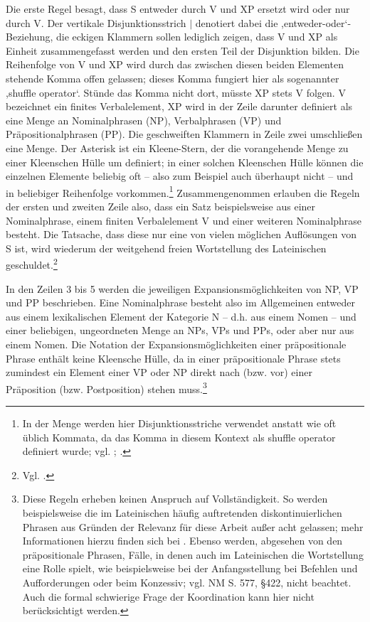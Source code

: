 \documentclass[12pt,a4paper]{article}
\begin{document}
Die erste Regel besagt, dass S entweder durch V und XP ersetzt wird oder nur durch V. Der vertikale Disjunktionsstrich $\mid$ denotiert dabei die ,entweder-oder‘-Beziehung, die eckigen Klammern sollen lediglich zeigen, dass V und XP als Einheit zusammengefasst werden und den ersten Teil der Disjunktion bilden. Die Reihenfolge von V und XP wird durch das zwischen diesen beiden Elementen stehende Komma offen gelassen; dieses Komma fungiert hier als sogenannter ,shuffle operator‘. Stünde das Komma nicht dort, müsste XP stets V folgen. V bezeichnet ein finites Verbalelement, XP wird in der Zeile darunter definiert als eine Menge an Nominalphrasen (NP), Verbalphrasen (VP) und Präpositionalphrasen (PP). Die geschweiften Klammern in Zeile zwei umschließen eine Menge. Der Asterisk ist ein Kleene-Stern, der die vorangehende Menge zu einer Kleenschen Hülle um definiert; in einer solchen Kleenschen Hülle können die einzelnen Elemente beliebig oft -- also zum Beispiel auch überhaupt nicht -- und in beliebiger Reihenfolge vorkommen.\footnote{In der Menge werden hier Disjunktionsstriche verwendet anstatt wie oft üblich Kommata, da das Komma in diesem Kontext als shuffle operator definiert wurde; vgl. \cite[26]{Skript}; \cite{Snijders}.} Zusammengenommen erlauben die Regeln der ersten und zweiten Zeile also, dass ein Satz beispielsweise aus einer Nominalphrase, einem finiten Verbalelement V und einer weiteren Nominalphrase besteht. Die Tatsache, dass diese nur eine von vielen möglichen Auflösungen von S ist, wird wiederum der weitgehend freien Wortstellung des Lateinischen geschuldet.\footnote{Vgl. \cite[19]{Rohrer}.}

In den Zeilen 3 bis 5 werden die jeweiligen Expansionsmöglichkeiten von NP, VP und PP beschrieben. Eine Nominalphrase besteht also im Allgemeinen entweder aus einem lexikalischen Element der Kategorie N – d.h. aus einem Nomen -- und einer beliebigen, ungeordneten Menge an NPs, VPs und PPs, oder aber nur aus einem Nomen.  Die Notation der Expansionsmöglichkeiten einer präpositionale Phrase enthält keine Kleensche Hülle, da in einer präpositionale Phrase stets zumindest ein Element einer VP oder NP direkt nach (bzw. vor) einer Präposition (bzw. Postposition) stehen muss.\footnote{Diese Regeln erheben keinen Anspruch auf Vollständigkeit. So werden beispielsweise die im Lateinischen häufig auftretenden diskontinuierlichen Phrasen aus Gründen der Relevanz für diese Arbeit außer acht gelassen; mehr Informationen hierzu finden sich bei \cite{Snijders}. Ebenso werden, abgesehen von den präpositionale Phrasen, Fälle, in denen auch im Lateinischen die Wortstellung eine Rolle spielt, wie beispielsweise bei der Anfangsstellung bei Befehlen und Aufforderungen oder beim Konzessiv; vgl. NM S. 577, §422, nicht beachtet. Auch die formal schwierige Frage der Koordination kann hier nicht berücksichtigt werden.}
\end{document}
